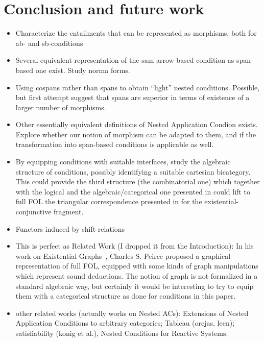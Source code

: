 \section{Conclusion and future work}

\begin{itemize}
    \item Characterize the entailments that can be represented as morphisms, both for ab- and sb-conditions
    \item Several equivalent representation of the sam arrow-based condition as span-based one exist. Study norma forms.
\item Using cospans rather than spans to obtain ``light'' nested conditions. Possible, but first attempt suggest that spans are superior in terms of existence of a larger number of morphisms.
\item Other essentially equivalent definitions of Nested Application Condion exists. Explore whether our notion of morphism can be adapted to them, and if the transformation into span-based conditions is applicable as well.
\item By equipping conditions with suitable interfaces, study the algebraic structure of conditions, possibly identifying a suitable cartesian bicategory. This could provide the third structure (the combinatorial one) which together with the logical and the algebraic/categorical one presented in \cite{DBLP:journals/corr/abs-2404-18795} could lift to full FOL the triangular correspondence presented in \cite{DBLP:conf/csl/BonchiSS18} for the existential-conjunctive fragment.
\item Functors induced by shift relations
\item This is perfect as Related Work (I dropped it from the Introduction): In his work on Existential Graphs~\cite{roberts1973-the-existential-graphs-of-charles-s.-peirce}, Charles S. Peirce proposed a graphical representation of full FOL, equipped with some kinds of graph manipulations which represent sound deductions. The notion of graph is not formalized in a standard algebraic way, but certainly it would be interesting to try to equip them with a categorical structure as done for conditions in this paper.  
\item other related works (actually works on Nested ACs): Extensions of Nested Application Conditions  to arbitrary categories; Tableau (orejas, leen); satisfiability (konig et al.), Nested Conditions for Reactive Systems. 
\end{itemize}

